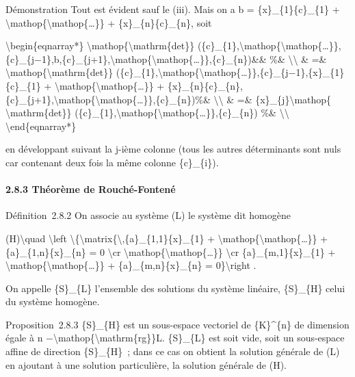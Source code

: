 \documentclass[]{article}
\begin{document}
Démonstration Tout est évident sauf le (iii). Mais on a b =
\{x\}\_\{1\}\{c\}\_\{1\} +
\textbackslash{}mathop\{\textbackslash{}mathop\{\ldots{}\}\} +
\{x\}\_\{n\}\{c\}\_\{n\}, soit

\textbackslash{}begin\{eqnarray*\}
\textbackslash{}mathop\{\textbackslash{}mathrm\{det\}\}
(\{c\}\_\{1\},\textbackslash{}mathop\{\textbackslash{}mathop\{\ldots{}\}\},\{c\}\_\{j−1\},b,\{c\}\_\{j+1\},\textbackslash{}mathop\{\textbackslash{}mathop\{\ldots{}\}\},\{c\}\_\{n\})\&\&
\%\& \textbackslash{}\textbackslash{} \& =\&
\textbackslash{}mathop\{\textbackslash{}mathrm\{det\}\}
(\{c\}\_\{1\},\textbackslash{}mathop\{\textbackslash{}mathop\{\ldots{}\}\},\{c\}\_\{j−1\},\{x\}\_\{1\}\{c\}\_\{1\}
+ \textbackslash{}mathop\{\textbackslash{}mathop\{\ldots{}\}\} +
\{x\}\_\{n\}\{c\}\_\{n\},\{c\}\_\{j+1\},\textbackslash{}mathop\{\textbackslash{}mathop\{\ldots{}\}\},\{c\}\_\{n\})\%\&
\textbackslash{}\textbackslash{} \& =\&
\{x\}\_\{j\}\textbackslash{}mathop\{ \textbackslash{}mathrm\{det\}\}
(\{c\}\_\{1\},\textbackslash{}mathop\{\textbackslash{}mathop\{\ldots{}\}\},\{c\}\_\{n\})
\%\& \textbackslash{}\textbackslash{} \textbackslash{}end\{eqnarray*\}

en développant suivant la j-ième colonne (tous les autres déterminants
sont nuls car contenant deux fois la même colonne \{c\}\_\{i\}).

\paragraph{2.8.3 Théorème de Rouché-Fontené}

Définition~2.8.2 On associe au système (L) le système dit homogène

(H)\textbackslash{}quad \textbackslash{}left
\textbackslash{}\{\textbackslash{}matrix\{\textbackslash{},\{a\}\_\{1,1\}\{x\}\_\{1\}
+ \textbackslash{}mathop\{\textbackslash{}mathop\{\ldots{}\}\} +
\{a\}\_\{1,n\}\{x\}\_\{n\} = 0 \textbackslash{}cr
\textbackslash{}mathop\{\textbackslash{}mathop\{\ldots{}\}\}
\textbackslash{}cr \{a\}\_\{m,1\}\{x\}\_\{1\} +
\textbackslash{}mathop\{\textbackslash{}mathop\{\ldots{}\}\} +
\{a\}\_\{m,n\}\{x\}\_\{n\} = 0\}\textbackslash{}right .

On appelle \{S\}\_\{L\} l'ensemble des solutions du système linéaire,
\{S\}\_\{H\} celui du système homogène.

Proposition~2.8.3 \{S\}\_\{H\} est un sous-espace vectoriel de
\{K\}\^{}\{n\} de dimension égale à n
−\textbackslash{}mathop\{\textbackslash{}mathrm\{rg\}\}L. \{S\}\_\{L\}
est soit vide, soit un sous-espace affine de direction \{S\}\_\{H\}~;
dans ce cas on obtient la solution générale de (L) en ajoutant à une
solution particulière, la solution générale de (H).
\end{document}
